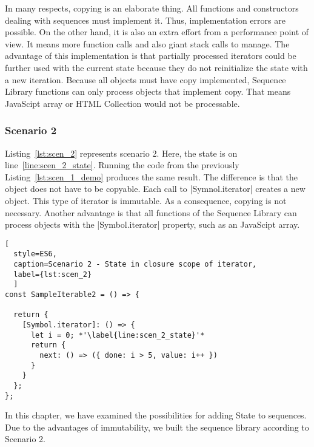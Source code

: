 In many respects, copying is an elaborate thing. All functions and constructors 
dealing with sequences must implement it. Thus, implementation errors are 
possible. On the other hand, it is also an extra effort from a performance point 
of view. It means more function calls and also giant stack calls to manage.
The advantage of this implementation is that partially processed iterators could 
be further used with the current state because they do not reinitialize the 
state with a new iteration.
Because all objects must have copy implemented, Sequence Library functions can 
only process objects that implement copy. That means JavaScipt array or HTML 
Collection would not be processable.

\subsubsection{Scenario 2}
Listing~\ref{lst:scen_2} represents scenario 2. Here, the state is on 
line~\ref{line:scen_2_state}. Running the code from the previously
Listing~\ref{lst:scen_1_demo} produces the same result. The difference is that 
the object does not have to be copyable. Each call to |Symnol.iterator| creates
a new object. This type of iterator is immutable. As a consequence, 
copying is not necessary. Another advantage is that all functions of the 
Sequence Library can process objects with the |Symbol.iterator| property, such 
as an JavaScipt array.

\begin{lstlisting}[
  style=ES6, 
  caption=Scenario 2 - State in closure scope of iterator,
  label={lst:scen_2}
  ]
const SampleIterable2 = () => {

  return {
    [Symbol.iterator]: () => {
      let i = 0; *'\label{line:scen_2_state}'*
      return {
        next: () => ({ done: i > 5, value: i++ })
      }
    }
  };
};
\end{lstlisting}

In this chapter, we have examined the possibilities for adding State to 
sequences. Due to the advantages of immutability, we built the sequence library 
according to Scenario 2.


